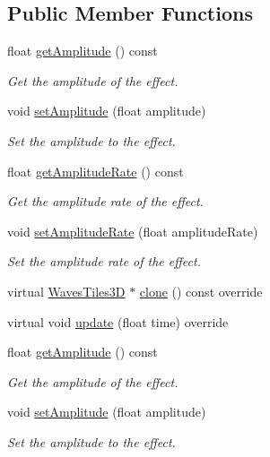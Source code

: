 \subsection*{Public Member Functions}
\begin{DoxyCompactItemize}
\item 
float \hyperlink{classWavesTiles3D_ad7036611a1e679ca1d7df8d6979b03de}{get\+Amplitude} () const
\begin{DoxyCompactList}\small\item\em Get the amplitude of the effect. \end{DoxyCompactList}\item 
void \hyperlink{classWavesTiles3D_a20dfb66b9c6eacc93064102bcad6faf2}{set\+Amplitude} (float amplitude)
\begin{DoxyCompactList}\small\item\em Set the amplitude to the effect. \end{DoxyCompactList}\item 
float \hyperlink{classWavesTiles3D_aac8edc171d3943248464c3fae596db1c}{get\+Amplitude\+Rate} () const
\begin{DoxyCompactList}\small\item\em Get the amplitude rate of the effect. \end{DoxyCompactList}\item 
void \hyperlink{classWavesTiles3D_a5c31881ea4cee059ce9ea49f1c8acb76}{set\+Amplitude\+Rate} (float amplitude\+Rate)
\begin{DoxyCompactList}\small\item\em Set the amplitude rate of the effect. \end{DoxyCompactList}\item 
virtual \hyperlink{classWavesTiles3D}{Waves\+Tiles3D} $\ast$ \hyperlink{classWavesTiles3D_a950db06f66d1b1c3b5bdfe053db5bffb}{clone} () const override
\item 
virtual void \hyperlink{classWavesTiles3D_a02aeb1343fa7e6fd530c35f805d49665}{update} (float time) override
\item 
float \hyperlink{classWavesTiles3D_ad7036611a1e679ca1d7df8d6979b03de}{get\+Amplitude} () const
\begin{DoxyCompactList}\small\item\em Get the amplitude of the effect. \end{DoxyCompactList}\item 
void \hyperlink{classWavesTiles3D_a20dfb66b9c6eacc93064102bcad6faf2}{set\+Amplitude} (float amplitude)
\begin{DoxyCompactList}\small\item\em Set the amplitude to the effect. \end{DoxyCompactList}\item 

\end{DoxyCompactItemize}
